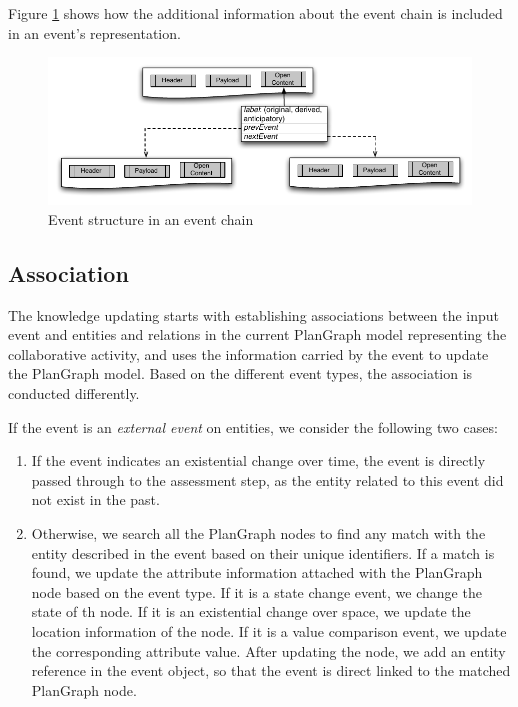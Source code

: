  Figure \ref{fig:event_chain_structure} shows how the additional information about the event chain is included in an event's representation. 

\begin{figure}[htbp] %
	\centering
	\includegraphics{event_chain_structure.pdf} 
	\caption{Event structure in an event chain}
	\label{fig:event_chain_structure}
\end{figure}

\subsection{Association} %
\label{sub:association}
The knowledge updating starts with establishing associations between the input event and entities and relations in the current PlanGraph model representing the collaborative activity, and uses the information carried by the event to update the PlanGraph model. Based on the different event types, the association is conducted differently.

If the event is an \emph{external event} on entities, we consider the following two cases:
\begin{enumerate}
	\item If the event indicates an existential change over time, the event is directly passed through to the assessment step, as the entity related to this event did not exist in the past.
	\item Otherwise, we search all the PlanGraph nodes to find any match with the entity described in the event based on their unique identifiers. If a match is found, we update the attribute information attached with the PlanGraph node based on the event type. If it is a state change event, we change the state of th node. If it is an existential change over space, we update the location information of the node. If it is a value comparison event, we update the corresponding attribute value. After updating the node, we add an entity reference in the event object, so that the event is direct linked to the matched PlanGraph node.
\end{enumerate}

